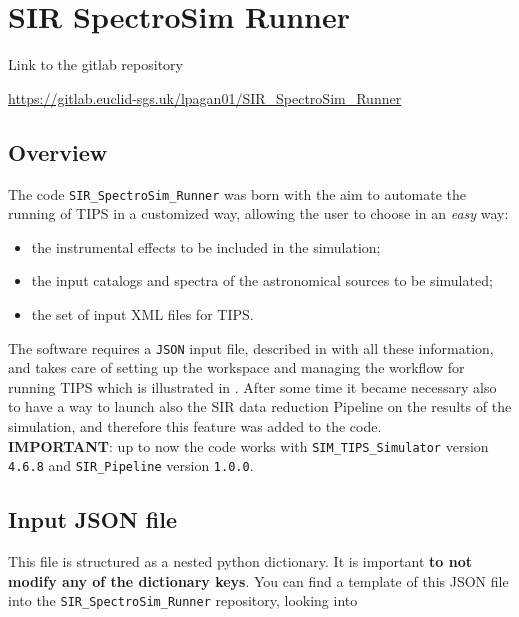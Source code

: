 \section{SIR SpectroSim Runner}\label{sec:sir_runner}

Link to the gitlab repository

\begin{center}
\hypertarget{url:sir_runner_gitlab}{\url{https://gitlab.euclid-sgs.uk/lpagan01/SIR_SpectroSim_Runner}}
\end{center}

\subsection{Overview}

The code \verb+SIR_SpectroSim_Runner+ was born with the aim to automate the running of TIPS in a customized way, allowing the user to choose in an \emph{easy} way:

\begin{itemize}
\item the instrumental effects to be included in the simulation;
\item the input catalogs and spectra of the astronomical sources to be simulated;
\item the set of input XML files for TIPS.
\end{itemize}

The software requires a \verb+JSON+ input file, described in  with all these information, and takes care of setting up the workspace and managing the workflow for running TIPS which is illustrated in . After some time it became necessary also to have a way to launch also the SIR data reduction Pipeline on the results of the simulation, and therefore this feature was added to the code.\\
\textbf{IMPORTANT}: up to now the code works with \verb+SIM_TIPS_Simulator+ version \verb+4.6.8+ and \verb+SIR_Pipeline+ version \verb+1.0.0+.

\subsection{Input JSON file}\label{subsec:input_JSON}
This file is structured as a nested python dictionary. It is important \textbf{to not modify any of the dictionary keys}. You can find a template of this JSON file into the \verb+SIR_SpectroSim_Runner+ repository, looking into

